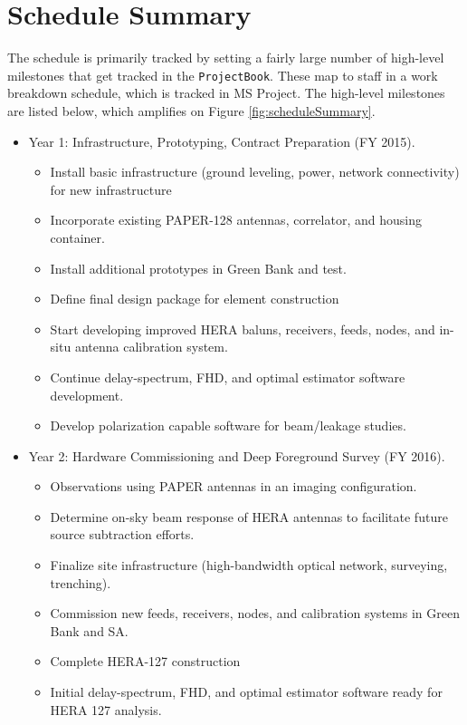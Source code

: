 \documentclass[preprint]{aastex}
\begin{document}
\section{Schedule Summary}
\label{sec:schedule}
The schedule is primarily tracked by setting a fairly large number of high-level
milestones that get tracked in the {\tt ProjectBook}. These map to staff in a work
breakdown schedule, which is tracked in MS Project. The high-level milestones are
listed below, which amplifies on Figure \ref{fig:scheduleSummary}.


\begin{itemize}[itemsep=-4pt,parsep=-3pt]
\item Year 1:  Infrastructure, Prototyping, Contract Preparation (FY 2015).
\begin{itemize}[itemsep=-4pt]
\item Install basic infrastructure (ground leveling, power, network connectivity) for new infrastructure
\item Incorporate existing PAPER-128 antennas, correlator, and housing container. 
\item Install additional prototypes in Green Bank and test.
\item Define final design package for element construction
\item Start developing improved HERA baluns, receivers, feeds, nodes, and in-situ antenna calibration system. 
\item Continue delay-spectrum, FHD, and optimal estimator software development.
\item Develop polarization capable software for beam/leakage studies.
\end{itemize}
\item Year 2:  Hardware Commissioning and Deep Foreground Survey (FY 2016). 
\begin{itemize}[itemsep=-4pt]
\item Observations using PAPER antennas in an imaging configuration. 
\item Determine on-sky beam response of HERA antennas to facilitate future source subtraction efforts. 
\item Finalize site infrastructure (high-bandwidth optical network, surveying, trenching). 
\item Commission new feeds, receivers, nodes, and calibration systems in Green Bank and SA. 
\item Complete HERA-127 construction
\item Initial delay-spectrum, FHD, and optimal estimator software ready for HERA 127 analysis.

\end{itemize}
\end{itemize}
\end{document}
